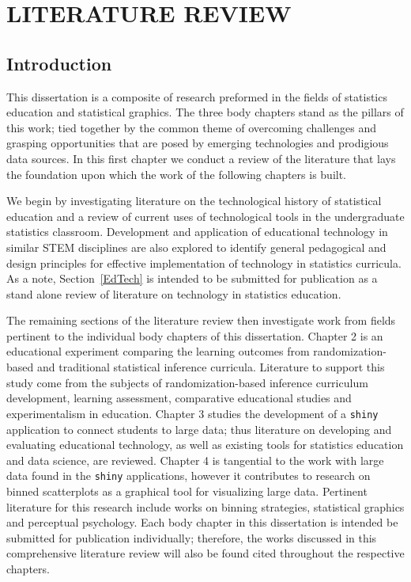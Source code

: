 \chapter{LITERATURE REVIEW}\label{litreview}

\section{Introduction}

This dissertation is a composite of research preformed in the fields of statistics education and statistical graphics. The three body chapters stand as the pillars of this work; tied together by the common theme of overcoming challenges and grasping opportunities that are posed by emerging technologies and prodigious data sources. In this first chapter we conduct a review of the literature that lays the foundation upon which the work of the following chapters is built. 

We begin by investigating literature on the technological history of statistical education and a review of current uses of technological tools in the undergraduate statistics classroom. Development and application of educational technology in similar STEM disciplines are also explored to identify general pedagogical and design principles for effective implementation of technology in statistics curricula. As a note, Section~\ref{EdTech} is intended to be submitted for publication as a stand alone review of literature on technology in statistics education.

The remaining sections of the literature review then investigate work from fields pertinent to the individual body chapters of this dissertation. Chapter 2 is an educational experiment comparing the learning outcomes from randomization-based and traditional statistical inference curricula. Literature to support this study come from the subjects of randomization-based inference curriculum development, learning assessment, comparative educational studies and experimentalism in education. Chapter 3 studies the development of a \texttt{shiny} \citep{shiny} application to connect students to large data; thus literature on developing and evaluating educational technology, as well as existing tools for statistics education and data science, are reviewed. Chapter 4 is tangential to the work with large data found in the \texttt{shiny} applications, however it contributes to research on binned scatterplots as a graphical tool for visualizing large data. Pertinent literature for this research include works on binning strategies, statistical graphics and perceptual psychology. Each body chapter in this dissertation is intended be submitted for publication individually; therefore, the works discussed in this comprehensive literature review will also be found cited throughout the respective chapters.

